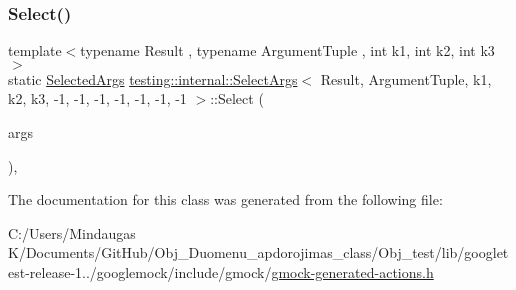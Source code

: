 \subsubsection{\texorpdfstring{Select()}{Select()}}
{\footnotesize\ttfamily template$<$typename Result , typename Argument\+Tuple , int k1, int k2, int k3$>$ \\
static \mbox{\hyperlink{classtesting_1_1internal_1_1_select_args_3_01_result_00_01_argument_tuple_00_01k1_00_01k2_00_01k43121451b69bc30ee1dad887e67d8807_a6780fe203ee6f054ad07b84d9ec68dfd}{Selected\+Args}} \mbox{\hyperlink{classtesting_1_1internal_1_1_select_args}{testing\+::internal\+::\+Select\+Args}}$<$ Result, Argument\+Tuple, k1, k2, k3, -\/1, -\/1, -\/1, -\/1, -\/1, -\/1, -\/1 $>$\+::Select (\begin{DoxyParamCaption}\item[{const Argument\+Tuple \&}]{args }\end{DoxyParamCaption})\hspace{0.3cm}{\ttfamily [inline]}, {\ttfamily [static]}}



The documentation for this class was generated from the following file\+:\begin{DoxyCompactItemize}
\item 
C\+:/\+Users/\+Mindaugas K/\+Documents/\+Git\+Hub/\+Obj\+\_\+\+Duomenu\+\_\+apdorojimas\+\_\+class/\+Obj\+\_\+test/lib/googletest-\/release-\/1../googlemock/include/gmock/\mbox{\hyperlink{_obj__test_2lib_2googletest-release-1_88_81_2googlemock_2include_2gmock_2gmock-generated-actions_8h}{gmock-\/generated-\/actions.\+h}}\end{DoxyCompactItemize}
